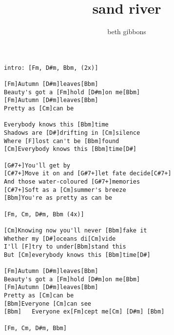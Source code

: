 \author{beth gibbons}
\title{sand river}
\maketitle
\begin{verbatim}
intro: [Fm, D#m, Bbm, (2x)]

[Fm]Autumn [D#m]leaves[Bbm]
Beauty's got a [Fm]hold [D#m]on me[Bbm]
[Fm]Autumn [D#m]leaves[Bbm]
Pretty as [Cm]can be

Everybody knows this [Bbm]time
Shadows are [D#]drifting in [Cm]silence
Where [F]lost can't be [Bbm]found
[Cm]Everybody knows this [Bbm]time[D#]

[G#7+]You'll get by
[C#7+]Move it on and [G#7+]let fate decide[C#7+]
And those water-coloured [G#7+]memories
[C#7+]Soft as a [Cm]summer's breeze
[Bbm]You're as pretty as can be

[Fm, Cm, D#m, Bbm (4x)]

[Cm]Knowing now you'll never [Bbm]fake it
Whether my [D#]oceans di[Cm]vide
I'll [F]try to under[Bbm]stand this
But [Cm]everybody knows this [Bbm]time[D#]

[Fm]Autumn [D#m]leaves[Bbm]
Beauty's got a [Fm]hold [D#m]on me[Bbm]
[Fm]Autumn [D#m]leaves[Bbm]
Pretty as [Cm]can be
[Bbm]Everyone [Cm]can see
[Bbm]   Everyone ex[Fm]cept me[Cm] [D#m] [Bbm]

[Fm, Cm, D#m, Bbm]
\end{verbatim}